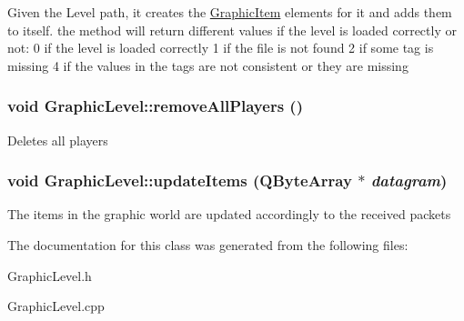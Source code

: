 Given the Level path, it creates the \hyperlink{classGraphicItem}{GraphicItem} elements for it and adds them to itself. the method will return different values if the level is loaded correctly or not: 0 if the level is loaded correctly 1 if the file is not found 2 if some tag is missing 4 if the values in the tags are not consistent or they are missing \hypertarget{classGraphicLevel_a2727bfe10c94494b7dddd4413d99cbff}{
\subsubsection[{removeAllPlayers}]{\setlength{\rightskip}{0pt plus 5cm}void GraphicLevel::removeAllPlayers ()}}
\label{classGraphicLevel_a2727bfe10c94494b7dddd4413d99cbff}
Deletes all players \hypertarget{classGraphicLevel_a369384369a71c03e16b5a7fbcf11083d}{
\subsubsection[{updateItems}]{\setlength{\rightskip}{0pt plus 5cm}void GraphicLevel::updateItems (QByteArray $\ast$ {\em datagram})}}
\label{classGraphicLevel_a369384369a71c03e16b5a7fbcf11083d}
The items in the graphic world are updated accordingly to the received packets 

The documentation for this class was generated from the following files:\begin{DoxyCompactItemize}
\item 
GraphicLevel.h\item 
GraphicLevel.cpp\end{DoxyCompactItemize}
